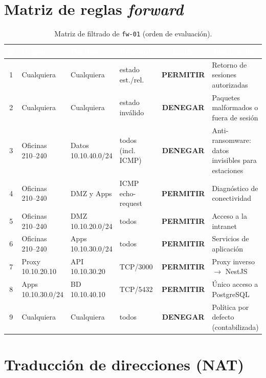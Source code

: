 \documentclass[11pt,a4paper,oneside]{report}
\newcommand{\permitir}{\textcolor{green!45!black}{\textbf{PERMITIR}}}
\newcommand{\denegar}{\textcolor{fvRojo}{\textbf{DENEGAR}}}
\newcommand{\cod}[1]{\texttt{\small #1}}
\begin{document}
\section{Matriz de reglas \emph{forward}}

\begin{table}[htbp]
\centering\small
\caption{Matriz de filtrado de \cod{fw-01} (orden de evaluación).}
\label{tab:fw-forward}
\begin{tabularx}{\textwidth}{@{}c L{2.9cm} L{2.6cm} L{2.0cm} c X@{}}
\toprule
{}
\textcolor{white}{\textbf{\#}} & \textcolor{white}{\textbf{Origen}} & \textcolor{white}{\textbf{Destino}} &
\textcolor{white}{\textbf{Protocolo}} & \textcolor{white}{\textbf{Acción}} & \textcolor{white}{\textbf{Justificación}} \\
 & Cualquiera & Cualquiera & estado est./rel. & \permitir & Retorno de sesiones autorizadas \\
2 & Cualquiera & Cualquiera & estado inválido & \denegar & Paquetes malformados o fuera de sesión \\
3 & Oficinas 210--240 & Datos 10.10.40.0/24 & todos (incl. ICMP) & \denegar & Anti-ransomware: datos invisibles para estaciones \\
4 & Oficinas 210--240 & DMZ y Apps & ICMP echo-request & \permitir & Diagnóstico de conectividad \\
5 & Oficinas 210--240 & DMZ 10.10.20.0/24 & todos & \permitir & Acceso a la intranet \\
6 & Oficinas 210--240 & Apps 10.10.30.0/24 & todos & \permitir & Servicios de aplicación \\
7 & Proxy 10.10.20.10 & API 10.10.30.20 & TCP/3000 & \permitir & Proxy inverso $\rightarrow$ NestJS \\
8 & Apps 10.10.30.0/24 & BD 10.10.40.10 & TCP/5432 & \permitir & Único acceso a PostgreSQL \\
9 & Cualquiera & Cualquiera & todos & \denegar & Política por defecto (contabilizada) \\
\bottomrule
\end{tabularx}
\end{table}

\section{Traducción de direcciones (NAT)}
\end{document}
